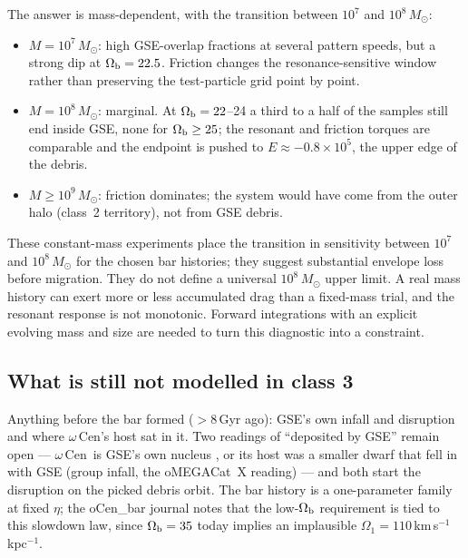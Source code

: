 \documentclass[11pt,a4paper]{article}
\newcommand{\kmskpc}{km\,s$^{-1}$\,kpc$^{-1}$}
\newcommand{\ocen}{$\omega$\,Cen}
\newcommand{\Msun}{M_\odot}
\newcommand{\Ob}{\Omega_{\rm b}}
\begin{document}
The answer is mass-dependent, with the transition between $10^7$ and $10^8\,\Msun$:
\begin{itemize}
\item $M=10^7\,\Msun$: high GSE-overlap fractions at several pattern speeds, but a
  strong dip at $\Ob=22.5$. Friction changes the resonance-sensitive window rather than
  preserving the test-particle grid point by point.
\item $M=10^8\,\Msun$: marginal. At $\Ob=22$--24 a third to a half of the samples still end
  inside GSE, none for $\Ob\ge25$; the resonant and friction torques are comparable and the
  endpoint is pushed to $E\approx-0.8\times10^5$, the upper edge of the debris.
\item $M\ge10^9\,\Msun$: friction dominates; the system would have come from the outer halo
  (class~2 territory), not from GSE debris.
\end{itemize}
These constant-mass experiments place the transition in sensitivity between
$10^7$ and $10^8\,\Msun$ for the chosen bar histories; they suggest substantial envelope
loss before migration. They do not define a universal $10^8\,\Msun$ upper limit. A real
mass history can exert more or less accumulated drag than a fixed-mass trial, and the
resonant response is not monotonic. Forward integrations with an explicit evolving mass
and size are needed to turn this diagnostic into a constraint.

\subsection{What is still not modelled in class 3}
Anything before the bar formed ($>8$\,Gyr ago): GSE's own infall and disruption
\citep[fiducial: $M_\star=5\times10^8$, $M_{\rm DM}=2\times10^{11}\,\Msun$, $c=4$, from
$R_{\rm vir}$ at $z\approx2$, circularity 0.5, retrograde;][]{naidu2021} and where \ocen's
host sat in it. Two readings of ``deposited by GSE'' remain open --- \ocen\ is GSE's own nucleus
\citep{pfeffer2021}, or its host was a smaller dwarf that fell in with GSE (group infall, the
oMEGACat~X reading) --- and both start the disruption on the picked debris orbit. The bar
history is a one-parameter family at fixed $\eta$; the oCen\_bar journal notes that the
low-$\Ob$ requirement is tied to this slowdown law, since $\Ob=35$ today implies an
implausible $\Omega_1=110$\,\kmskpc.
\end{document}
